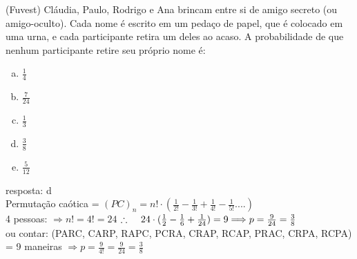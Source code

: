 \begin{ex}
  (Fuvest) Cláudia, Paulo, Rodrigo e Ana brincam entre si de amigo secreto (ou amigo-oculto). Cada nome é escrito em um pedaço de papel, que é colocado em uma urna, e cada participante retira um deles ao acaso. A probabilidade de que nenhum participante retire seu próprio nome é:
    \begin{enumerate}  [(a)]
        \item $\frac{1}{4}$
        \item $\frac{7}{24}$
        \item $\frac{1}{3}$
        \item $\frac{3}{8}$
        \item $\frac{5}{12}$
    \end{enumerate}
      \begin{sol}
       resposta: d \\
       Permutação caótica = $(PC)_n = n!\cdot(\frac{1}{2!}-\frac{1}{3!}+\frac{1}{4!}-\frac{1}{5!}....)$ \\
       4 pessoas: $\Rightarrow n!=4!=24$\hspace{0,4cm} 
       $\therefore \hspace{0,4cm} 24\cdot(\frac{1}{2}-\frac{1}{6}+\frac{1}{24})=9 \Longrightarrow p=\frac{9}{24}=\frac{3}{8}$\\
       ou contar: (PARC, CARP, RAPC, PCRA, CRAP, RCAP, PRAC, CRPA, RCPA) = 9 maneiras 
       $ \Longrightarrow p=\frac{9}{4!}=\frac{9}{24}=\frac{3}{8}$
      \end{sol}
 \end{ex}
